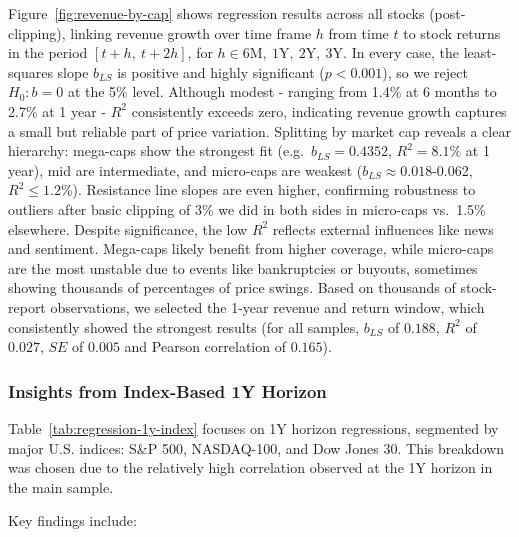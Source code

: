 \documentclass[11pt]{article}
\begin{document}
Figure~\ref{fig:revenue-by-cap} shows regression results across all stocks (post-clipping), linking revenue growth over time frame $h$ from time $t$ to stock returns in the period $[t+h,\ t+2h]$, for $h \in {6\text{M},\ 1\text{Y},\ 2\text{Y},\ 3\text{Y}}$.
In every case, the least-squares slope $b_{LS}$ is positive and highly significant ($p<0.001$), so we reject $H_0\colon b=0$ at the 5\% level.
Although modest - ranging from 1.4\% at 6 months to 2.7\% at 1 year - $R^2$ consistently exceeds zero, indicating revenue growth captures a small but reliable part of price variation.
Splitting by market cap reveals a clear hierarchy: mega-caps show the strongest fit (e.g.\ $b_{LS}=0.4352$, $R^2=8.1\%$ at 1 year), mid are intermediate, and micro-caps are weakest ($b_{LS}\approx0.018$-0.062, $R^2\le1.2\%$).
Resistance line slopes are even higher, confirming robustness to outliers after basic clipping of 3\% we did in both sides in micro-caps vs.\ 1.5\% elsewhere.
Despite significance, the low $R^2$ reflects external influences like news and sentiment.
Mega-caps likely benefit from higher coverage, while micro-caps are the most unstable due to events like bankruptcies or buyouts, sometimes showing thousands of percentages of price swings.
Based on thousands of stock-report observations, we selected the 1-year revenue and return window, which consistently showed the strongest results (for all samples, $b_{LS}$ of $0.188$, $R^2$ of $0.027$, $SE$ of $0.005$ and Pearson correlation of $0.165$).

\subsubsection{Insights from Index-Based 1Y Horizon}

Table~\ref{tab:regression-1y-index} focuses on 1Y horizon regressions, segmented by major U.S. indices: S\&P 500, NASDAQ-100, and Dow Jones 30. This breakdown was chosen due to the relatively high correlation observed at the 1Y horizon in the main sample.

Key findings include:
\end{document}
